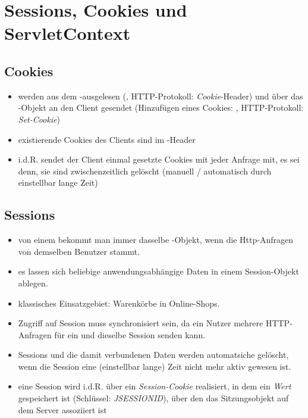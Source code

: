 \section{Sessions, Cookies und ServletContext}

\subsection{Cookies}

\begin{itemize}
    \item werden aus dem -ausgelesen (, HTTP-Protokoll: \textit{Cookie}-Header) und über das -Objekt an den Client gesendet (Hinzufügen eines Cookies: , HTTP-Protokoll: \textit{Set-Cookie})
    \item existierende Cookies des Clients sind im -Header
    \item i.d.R. sendet der Client einmal gesetzte Cookies mit jeder Anfrage mit, es sei denn, sie sind zwischenzeitlich gelöscht (manuell / automatisch durch einstellbar lange Zeit)
\end{itemize}


\subsection{Sessions}
\begin{itemize}
    \item von einem  bekommt man immer dasselbe -Objekt, wenn die Http-Anfragen von demselben Benutzer stammt.
    \item es lassen sich beliebige anwendungsabhängige Daten in einem Session-Objekt ablegen.
    \item klassisches Einsatzgebiet: Warenkörbe in Online-Shops.
    \item Zugriff auf Session muss synchronisiert sein, da ein Nutzer mehrere HTTP-Anfragen für ein und dieselbe Session senden kann.
    \item Sessions und die damit verbundenen Daten werden automatsiche gelöscht, wenn die Session eine (einstellbar lange) Zeit nicht mehr aktiv gewesen ist.
    \item eine Session wird i.d.R. über ein \textit{Session-Cookie} realisiert, in dem ein \textit{Wert} gespeichert ist (Schlüssel: \textit{JSESSIONID}), über den das Sitzungsobjekt auf dem Server assoziiert ist
\end{itemize}


